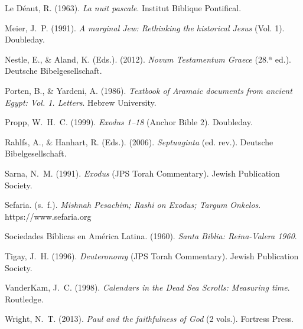\documentclass[11pt,letterpaper]{article}
\newcommand{\refapa}[1]{\par{\RaggedRight\hangindent=1.27cm\hangafter=1\noindent #1\par}\vspace{4pt}}
\begin{document}
\refapa{Le Déaut, R. (1963). \emph{La nuit pascale}. Institut Biblique Pontifical.}
\refapa{Meier, J.~P. (1991). \emph{A marginal Jew: Rethinking the historical Jesus} (Vol. 1). Doubleday.}
\refapa{Nestle, E., \& Aland, K. (Eds.). (2012). \emph{Novum Testamentum Graece} (28.ª ed.). Deutsche Bibelgesellschaft.}
\refapa{Porten, B., \& Yardeni, A. (1986). \emph{Textbook of Aramaic documents from ancient Egypt: Vol. 1. Letters}. Hebrew University.}
\refapa{Propp, W.~H.~C. (1999). \emph{Exodus 1--18} (Anchor Bible 2). Doubleday.}
\refapa{Rahlfs, A., \& Hanhart, R. (Eds.). (2006). \emph{Septuaginta} (ed. rev.). Deutsche Bibelgesellschaft.}
\refapa{Sarna, N.~M. (1991). \emph{Exodus} (JPS Torah Commentary). Jewish Publication Society.}
\refapa{Sefaria. (s.~f.). \emph{Mishnah Pesachim; Rashi on Exodus; Targum Onkelos}. https://www.sefaria.org}
\refapa{Sociedades Bíblicas en América Latina. (1960). \emph{Santa Biblia: Reina-Valera 1960}.}
\refapa{Tigay, J.~H. (1996). \emph{Deuteronomy} (JPS Torah Commentary). Jewish Publication Society.}
\refapa{VanderKam, J.~C. (1998). \emph{Calendars in the Dead Sea Scrolls: Measuring time}. Routledge.}
\refapa{Wright, N.~T. (2013). \emph{Paul and the faithfulness of God} (2 vols.). Fortress Press.}
\end{document}
